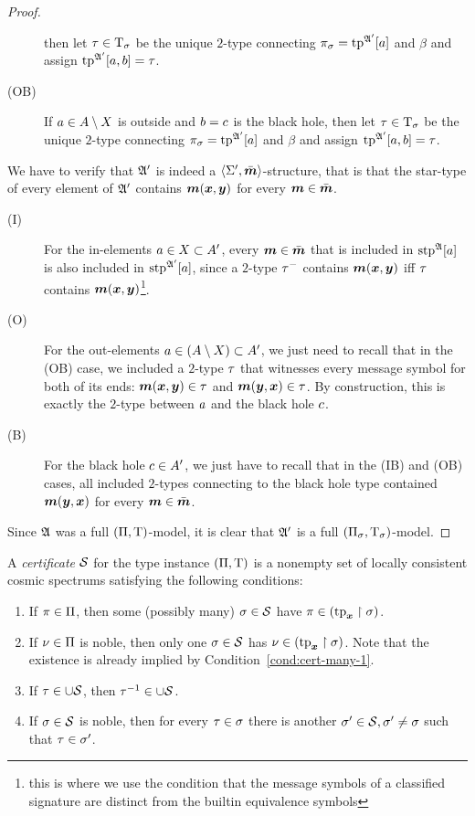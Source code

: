 \begin{proof}
\begin{description}
  then let $\tau \in \mathrm{T}_\sigma$ be the unique $2$-type connecting $\pi_\sigma =
  \operatorname{tp}^{\mathfrak{A'}}[a]$ and $\beta$ and assign $\operatorname{tp}^{\mathfrak{A'}}[a,b] = \tau$.
  \item[(OB)] If $a \in A \setminus X$ is outside and $b = c$ is the
  black hole, then let $\tau \in \mathrm{T}_\sigma$ be the unique $2$-type connecting
  $\pi_\sigma = \operatorname{tp}^{\mathfrak{A'}}[a]$ and $\beta$ and assign $\operatorname{tp}^{\mathfrak{A'}}[a,b] =
  \tau$.
\end{description}
We have to verify that $\mathfrak{A'}$ is indeed a $\left\langle \mathrm{\Sigma'},\bar{\bm{m}} \right\rangle$-structure, that
is that the star-type of every element of $\mathfrak{A'}$ contains $\bm{m}(\bm{x},\bm{y})$ for
every $\bm{m} \in \bar{\bm{m}}$. 
\begin{description}
\item[(I)] For the in-elements $a \in X \subset A'$, every
$\bm{m} \in \bar{\bm{m}}$ that is included in $\operatorname{stp}^{\mathfrak{A}}[a]$ is also included in
$\operatorname{stp}^{\mathfrak{A'}}[a]$, since a $2$-type $\tau^{-}$ contains $\bm{m}(\bm{x},\bm{y})$ iff
$\tau$ contains $\bm{m}(\bm{x},\bm{y})$\footnote{this is where we use the condition
that the message symbols of a classified signature are distinct from the
builtin equivalence symbols}.
\item[(O)] For the out-elements $a \in (A \setminus X) \subset A'$, we
just need to recall that in the (OB) case, we included a $2$-type $\tau$ that
witnesses every message symbol for both of its ends: $\bm{m}(\bm{x},\bm{y}) \in \tau$
and $\bm{m}(\bm{y},\bm{x}) \in \tau$. By construction, this is exactly the $2$-type
between $a$ and the black hole $c$.
\item[(B)] For the black hole $c \in A'$, we just have to recall that in
the (IB) and (OB) cases, all included $2$-types connecting to the black hole
type contained $\bm{m}(\bm{y},\bm{x})$ for every $\bm{m} \in \bar{\bm{m}}$.
\end{description}
Since $\mathfrak{A}$ was a full $(\Pi,\mathrm{T})$-model, it is clear that $\mathfrak{A'}$ is a
full $(\Pi_\sigma,\mathrm{T}_\sigma)$-model.
\end{proof}
\begin{definition}
A \emph{certificate} $\mathcal{S}$ for the type instance $(\Pi,\mathrm{T})$ is a
nonempty set of locally consistent cosmic spectrums satisfying the following
conditions:
\begin{enumerate}
  \item\label{cond:cert-many-1} If $\pi \in \Pi$, then some (possibly many)
  $\sigma \in \mathcal{S}$ have $\pi \in (\operatorname{tp}_{\bm{x}}\restriction \sigma)$.
  \item\label{cond:cert-many-2} If $\nu \in \Pi$ is noble, then only one
  $\sigma \in \mathcal{S}$ has $\nu \in (\operatorname{tp}_{\bm{x}}\restriction \sigma)$. Note that the
  existence is already implied by Condition~\ref{cond:cert-many-1}.
  \item\label{cond:cert-many-3} If $\tau \in \cup\mathcal{S}$, then $\tau^{-1} \in
  \cup\mathcal{S}$.
  \item\label{cond:cert-many-4} If $\sigma\in\mathcal{S}$ is noble, then for every
  $\tau \in \sigma$ there is another $\sigma'\in\mathcal{S}, \sigma' \neq \sigma$ such that $\tau \in \sigma'$.
\end{enumerate}
\end{definition}
